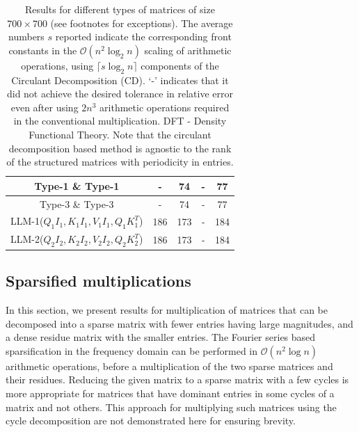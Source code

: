 \documentclass[onefignum,onetabnum]{siamart171218}
\begin{document}
\begin{table}[H]
\begin{tabular}{|c|c|c|c|c|}
         \hline
        Type-1 \& Type-1\footnotemark[4]& - &74 & -& 77 \\         
         \hline
         Type-3 \& Type-3\footnotemark[4]&-  & 74&- & 77   \\
        \hline
        LLM-1($Q_1I_1,K_1I_1,V_1I_1,Q_1K_1^T$)\footnotemark[4]&186&173&-&184\\
         \hline
         LLM-2($Q_2I_2, K_2I_2, V_2I_2,Q_2K_2^T$)\footnotemark[4]&186&173&-&184\\
         \hline
    \end{tabular}
    \caption{Results for different types of matrices of size $700 \times 700$ (see footnotes for exceptions). The average numbers $s$ reported indicate the corresponding front constants in the $\mathcal{O}(n^2 \log_2 n)$ scaling of arithmetic operations, using $\lceil s \log_2 n \rceil$ components of the Circulant Decomposition (CD). `-' indicates that it did not achieve the desired tolerance in relative error even after using $2n^3$ arithmetic operations required in the conventional multiplication. DFT - Density Functional Theory. Note that the circulant decomposition based method is agnostic to the rank of the structured matrices with periodicity in entries.}
    \label{tab:cd1}
\end{table}

\subsection{Sparsified multiplications}
In this section, we present results for multiplication of matrices that can be decomposed into a sparse matrix with fewer entries having large magnitudes, and a dense residue matrix with the smaller entries. The Fourier series based sparsification in the frequency domain can be performed in $\mathcal{O}(n^2 \log n)$ arithmetic operations, before a multiplication of the two sparse matrices and their residues. Reducing the given matrix to a sparse matrix with a few cycles is more appropriate for matrices that have dominant entries in some cycles of a matrix and not others. This approach for multiplying such matrices using the cycle decomposition are not demonstrated here for ensuring brevity. 
\end{document}
